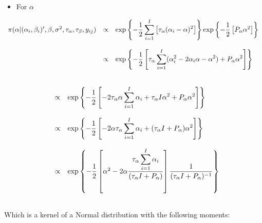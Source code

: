 \documentclass{article}
\begin{document}
\begin{itemize}
\item For $\alpha$
\end{itemize}

\begin{equation*}
\begin{array}{lcl ll }

\pi(\alpha |(\alpha_i, \beta_i)', \beta, \sigma^2, \tau_\alpha, \tau_\beta ,y_{ij}) & \propto & \mbox{exp}\left\{ - \dfrac{1}{2} 
\displaystyle\sum_{i=1}^{I} \left[ \tau_{\alpha}(\alpha_{i} - \alpha)^2 \right]\right\}  \mbox{exp}\left\{ - \dfrac{1}{2} \left[ P_{\alpha}\alpha^2\right] \right\} \\ \\

& \propto & \mbox{exp}\left\{ - \dfrac{1}{2} \left[ 
\tau_{\alpha}\displaystyle\sum_{i=1}^{I} (\alpha_{i}^2 -2\alpha_{i}\alpha - \alpha^2) + P_{\alpha}\alpha^2\right] \right\} \\ \\

 \end{array}
\end{equation*}


\begin{equation*}
\begin{array}{lcl ll }

& \propto & \mbox{exp}\left\{ - \dfrac{1}{2} \left[ -2
\tau_{\alpha}\alpha\displaystyle\sum_{i=1}^{I}\alpha_{i} + \tau_{\alpha}I\alpha^2 + P_{\alpha}\alpha^2\right] \right\} \\ \\

& \propto & \mbox{exp}\left\{ - \dfrac{1}{2} \left[ -2
\alpha\tau_{\alpha}\displaystyle\sum_{i=1}^{I}\alpha_{i} + (\tau_{\alpha}I + P_{\alpha})\alpha^2\right] \right\} \\ \\

& \propto & \mbox{exp}\left\{ - \dfrac{1}{2} \left[ \alpha^2 -2
\alpha\dfrac{\tau_{\alpha}\displaystyle\sum_{i=1}^{I}\alpha_{i}}{(\tau_{\alpha}I + P_{\alpha})} \right] \dfrac{1}{(\tau_{\alpha}I + P_{\alpha})^{-1}} \right\} \\ \\

 \end{array}
\end{equation*}

Which is a kernel of a Normal distribution with the following moments:\\
\end{document}
